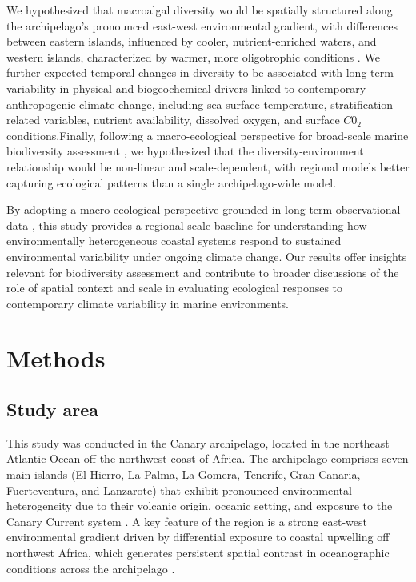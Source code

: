 \documentclass[a4paper,fleqn]{cas-sc}
\begin{document}
We hypothesized that macroalgal diversity would be spatially structured along the archipelago's pronounced east-west environmental gradient, with differences between eastern islands, influenced by cooler, nutrient-enriched waters, and western islands, characterized by warmer, more oligotrophic conditions \citep{Barton1998, Aristegui2009, Barton2016}. We further expected temporal changes in diversity to be associated with long-term variability in physical and biogeochemical drivers linked to contemporary anthropogenic climate change, including sea surface temperature, stratification-related variables, nutrient availability, dissolved oxygen, and surface $C0_{2}$ conditions.Finally, following a macro-ecological perspective for broad-scale marine biodiversity assessment \citep{Duffy2019Toward}, we hypothesized that the diversity-environment relationship would be non-linear and scale-dependent, with regional models better capturing ecological patterns than a single archipelago-wide model.

By adopting a macro-ecological perspective grounded in long-term observational data \citep{Duffy2019Toward}, this study provides a regional-scale baseline for understanding how environmentally heterogeneous coastal systems respond to sustained environmental variability under ongoing climate change. Our results offer insights relevant for biodiversity assessment and contribute to broader discussions of the role of spatial context and scale in evaluating ecological responses to contemporary climate variability in marine environments.



\section{Methods}
\subsection{Study area}
This study was conducted in the Canary archipelago, located in the northeast Atlantic Ocean off the northwest coast of Africa. The archipelago comprises seven main islands (El Hierro, La Palma, La Gomera, Tenerife, Gran Canaria, Fuerteventura, and Lanzarote) that exhibit pronounced environmental heterogeneity due to their volcanic origin, oceanic setting, and exposure to the Canary Current system \citep{Barton1998}. A key feature of the region is a strong east-west environmental gradient driven by differential exposure to coastal upwelling off northwest Africa, which generates persistent spatial contrast in oceanographic conditions across the archipelago \citep{Aristegui2009}.
\end{document}
